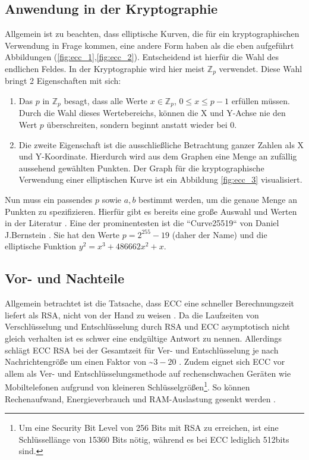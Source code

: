 \documentclass{scrreprt}
\begin{document}
\subsection{Anwendung in der Kryptographie}
Allgemein ist zu beachten, dass elliptische Kurven, die für ein kryptographischen Verwendung in Frage kommen, eine andere Form haben als die eben aufgeführt Abbildungen (\ref{fig:ecc_1},\ref{fig:ecc_2}). Entscheidend ist hierfür die Wahl des endlichen Feldes. In der Kryptographie wird hier meist $\mathbb{Z}_p$ verwendet. Diese Wahl bringt 2 Eigenschaften mit sich:
\begin{enumerate}
    \item Das $p$ in $\mathbb{Z}_p$ besagt, dass alle Werte $x \in \mathbb{Z}_p$, $0 \leq x \leq p-1$ erfüllen müssen. Durch die Wahl dieses Wertebereichs, können die X und Y-Achse nie den Wert $p$ überschreiten, sondern beginnt anstatt wieder bei 0.
    \item Die zweite Eigenschaft ist die ausschließliche Betrachtung ganzer Zahlen als X und Y-Koordinate. Hierdurch wird aus dem Graphen eine Menge an zufällig aussehend gewählten Punkten. Der Graph für die kryptographische Verwendung einer elliptischen Kurve ist ein Abbildung \ref{fig:ecc_3} visualisiert.
\end{enumerate}
Nun muss ein passendes $p$ sowie $a,b$ bestimmt werden, um die genaue Menge an Punkten zu spezifizieren. Hierfür gibt es bereits eine große Auswahl und Werten in der Literatur \cite{ecc-lochter2010elliptic}\cite{ecc-merkle2013elliptic}. Eine der prominentesten ist die ``Curve25519`` von Daniel J.Bernstein \cite{ecc-bernstein2006curve25519}. Sie hat den Werte $p=2^{255}-19$ (daher der Name) und die elliptische Funktion $y^2=x^3+486662x^2+x$.


\subsection{Vor- und Nachteile}
Allgemein betrachtet ist die Tatsache, dass ECC eine schneller Berechnungszeit liefert als RSA, nicht von der Hand zu weisen \cite{ecc-cloud2013elliptic}. Da die Laufzeiten von Verschlüsselung und Entschlüsselung durch RSA und ECC asymptotisch nicht gleich verhalten ist es schwer eine endgültige Antwort zu nennen. Allerdings schlägt ECC RSA bei der Gesamtzeit für Ver- und Entschlüsselung je nach Nachrichtengröße um einen Faktor von \textasciitilde $3-20$ \cite{ecc-mahto2018performance}\cite{ecc-bao2022research}. Zudem eignet sich ECC vor allem als Ver- und Entschlüsselungsmethode auf rechenschwachen Geräten wie Mobiltelefonen aufgrund von kleineren Schlüsselgrößen\footnote{Um eine Security Bit Level von 256 Bits mit RSA zu erreichen, ist eine Schlüssellänge von 15360 Bits nötig, während es bei ECC lediglich 512bits sind.\cite{ecc-mahto2018performance}}. So können Rechenaufwand, Energieverbrauch und RAM-Auslastung gesenkt werden \cite{ecc-gupta2011ecc}.
\end{document}

